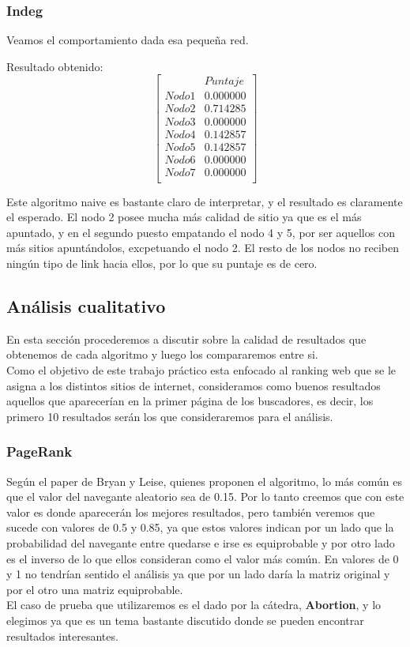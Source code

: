 \subsubsection{Indeg}
 	Veamos el comportamiento dada esa pequeña red.

 	Resultado obtenido:
   $$ 
\begin{bmatrix}
              &    Puntaje \\
 Nodo 1 &    0.000000 \\
 Nodo 2   &  0.714285 \\
 Nodo 3   &  0.000000 \\
 Nodo 4   &  0.142857 \\
 Nodo 5   &  0.142857 \\
 Nodo 6   &  0.000000 \\
 Nodo 7   &  0.000000 \\
\end{bmatrix} 
$$

Este algoritmo naive es bastante claro de interpretar, y el resultado es claramente el esperado. El nodo 2 posee mucha más calidad de sitio ya que es el más apuntado, y en el segundo puesto empatando el nodo 4 y 5, por ser aquellos con más sitios apuntándolos, excpetuando el nodo 2. El resto de los nodos no reciben ningún tipo de link hacia ellos, por lo que su puntaje es de cero.

\subsection{Análisis cualitativo}

En esta sección procederemos a discutir sobre la calidad de resultados que obtenemos de cada algoritmo y luego los compararemos entre si.\\
Como el objetivo de este trabajo práctico esta enfocado al ranking web que se le asigna a los distintos sitios de internet, consideramos como buenos resultados aquellos que aparecerían en la primer página de los buscadores, es decir, los primero 10 resultados serán los que consideraremos para el análisis.

\subsubsection{PageRank}
Según el paper de Bryan y Leise, quienes proponen el algoritmo, lo más común es que el valor del navegante aleatorio sea de 0.15. Por lo tanto creemos que con este valor es donde aparecerán los mejores resultados, pero también veremos que sucede con valores de 0.5 y 0.85, ya que estos valores indican por un lado que la probabilidad del navegante entre quedarse e irse es equiprobable y por otro lado es el inverso de lo que ellos consideran como el valor más común. En valores de 0 y 1 no tendrían sentido el análisis ya que por un lado daría la matriz original y por el otro una matriz equiprobable.\\
El caso de prueba que utilizaremos es el dado por la cátedra, \textbf{Abortion}, y lo elegimos ya que es un tema bastante discutido donde se pueden encontrar resultados interesantes.


